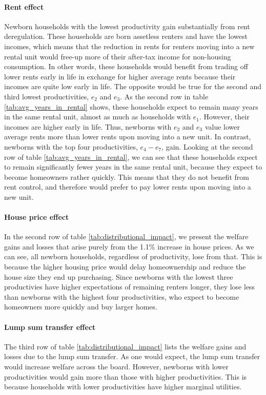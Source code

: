 \documentclass[parskip=full]{article}
\begin{document}
\paragraph{Rent effect} Newborn households with the lowest productivity gain substantially from rent deregulation. These households are born assetless renters and have the lowest incomes, which means that the reduction in rents for renters moving into a new rental unit would free-up more of their after-tax income for non-housing consumption. In other words, these households would benefit from trading off lower rents early in life in exchange for higher average rents because their incomes are quite low early in life. The opposite would be true for the second and third lowest productivities, $e_{2}$ and $e_{3}$. As the second row in table \ref{tab:avg_years_in_rental} shows, these households expect to remain many years in the same rental unit, almost as much as households with $e_{1}$. However, their incomes are higher early in life. Thus, newborns with $e_{2}$ and $e_{3}$ value lower average rents more than lower rents upon moving into a new unit. In contrast, newborns with the top four productivities, $e_{4}-e_{7}$, gain. Looking at the second row of table \ref{tab:avg_years_in_rental}, we can see that these households expect to remain significantly fewer years in the same rental unit, because they expect to become homeowners rather quickly. This means that they do not benefit from rent control, and therefore would prefer to pay lower rents upon moving into a new unit.

\paragraph{House price effect} In the second row of table \ref{tab:distributional_impact}, we present the welfare gains and losses that arise purely from the 1.1\% increase in house prices. As we can see, all newborn households, regardless of productivity, lose from that. This is because the higher housing price would delay homeownership and reduce the house size they end up purchasing. Since newborns with the lowest three productivies have higher expectations of remaining renters longer, they lose less than newborns with the highest four productivities, who expect to become homeowners more quickly and buy larger homes. 

\paragraph{Lump sum transfer effect} The third row of table \ref{tab:distributional_impact} lists the welfare gains and losses due to the lump sum transfer. As one would expect, the lump sum transfer would increase welfare across the board. However, newborns with lower productivities would gain more than those with higher productivities. This is because households with lower productivities have higher marginal utilities.
\end{document}
